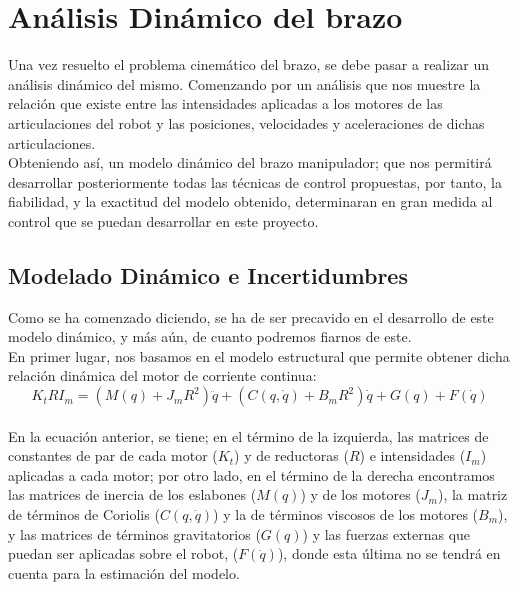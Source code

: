 \section{Análisis Dinámico del brazo}
Una vez resuelto el problema cinemático del brazo, se debe pasar a realizar un análisis dinámico del mismo. Comenzando por un análisis que nos muestre la relación que existe entre las intensidades aplicadas a los motores de las articulaciones del robot y las posiciones, velocidades y aceleraciones de dichas articulaciones.\\

Obteniendo así, un modelo dinámico del brazo manipulador; que nos permitirá desarrollar posteriormente todas las técnicas de control propuestas, por tanto, la fiabilidad, y la exactitud del modelo obtenido, determinaran en gran medida al control que se puedan desarrollar en este proyecto.





\subsection{Modelado Dinámico e Incertidumbres}

Como se ha comenzado diciendo, se ha de ser precavido en el desarrollo de este modelo dinámico, y más aún, de cuanto podremos fiarnos de este.\\



En primer lugar, nos basamos en el modelo estructural que permite obtener dicha relación dinámica del motor de corriente continua:\\



\begin{equation}
K_tRI_m=(M(q)+J_mR^2)\ddot{q}+(C(q,\dot{q})+B_mR^2)\dot{q}+G(q)+F(\dot{q})
\end{equation}\\



En la ecuación anterior, se tiene; en el término de la izquierda, las matrices de constantes de par de cada motor ($K_t$) y de reductoras ($R$) e intensidades ($I_m$) aplicadas a cada motor; por otro lado, en el término de la derecha encontramos las matrices de inercia de los eslabones ($M(q)$) y de los motores ($J_m$), la matriz de términos de Coriolis ($C(q,\dot{q})$) y la de términos viscosos de los motores ($B_m$), y las matrices de términos gravitatorios ($G(q)$) y las fuerzas externas que puedan ser aplicadas sobre el robot, ($F(\dot{q})$), donde esta última no se tendrá en cuenta para la estimación del modelo.\\



